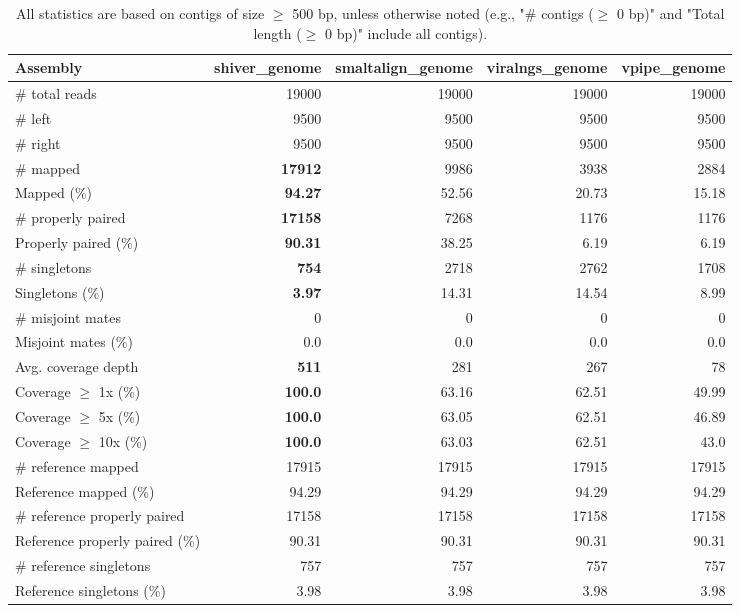 \documentclass[12pt,a4paper]{article}
\begin{document}
\begin{table}[ht]
\begin{center}
\caption{All statistics are based on contigs of size $\geq$ 500 bp, unless otherwise noted (e.g., "\# contigs ($\geq$ 0 bp)" and "Total length ($\geq$ 0 bp)" include all contigs).}
\begin{tabular}{|l*{4}{|r}|}
\hline
Assembly & shiver\_genome & smaltalign\_genome & viralngs\_genome & vpipe\_genome \\ \hline
\# total reads & 19000 & 19000 & 19000 & 19000 \\ \hline
\# left & 9500 & 9500 & 9500 & 9500 \\ \hline
\# right & 9500 & 9500 & 9500 & 9500 \\ \hline
\# mapped & {\bf 17912} & 9986 & 3938 & 2884 \\ \hline
Mapped (\%) & {\bf 94.27} & 52.56 & 20.73 & 15.18 \\ \hline
\# properly paired & {\bf 17158} & 7268 & 1176 & 1176 \\ \hline
Properly paired (\%) & {\bf 90.31} & 38.25 & 6.19 & 6.19 \\ \hline
\# singletons & {\bf 754} & 2718 & 2762 & 1708 \\ \hline
Singletons (\%) & {\bf 3.97} & 14.31 & 14.54 & 8.99 \\ \hline
\# misjoint mates & 0 & 0 & 0 & 0 \\ \hline
Misjoint mates (\%) & 0.0 & 0.0 & 0.0 & 0.0 \\ \hline
Avg. coverage depth & {\bf 511} & 281 & 267 & 78 \\ \hline
Coverage $\geq$ 1x (\%) & {\bf 100.0} & 63.16 & 62.51 & 49.99 \\ \hline
Coverage $\geq$ 5x (\%) & {\bf 100.0} & 63.05 & 62.51 & 46.89 \\ \hline
Coverage $\geq$ 10x (\%) & {\bf 100.0} & 63.03 & 62.51 & 43.0 \\ \hline
\# reference mapped & 17915 & 17915 & 17915 & 17915 \\ \hline
Reference mapped (\%) & 94.29 & 94.29 & 94.29 & 94.29 \\ \hline
\# reference properly paired & 17158 & 17158 & 17158 & 17158 \\ \hline
Reference properly paired (\%) & 90.31 & 90.31 & 90.31 & 90.31 \\ \hline
\# reference singletons & 757 & 757 & 757 & 757 \\ \hline
Reference singletons (\%) & 3.98 & 3.98 & 3.98 & 3.98 \\ \hline

\end{tabular}
\end{center}
\end{table}
\end{document}
